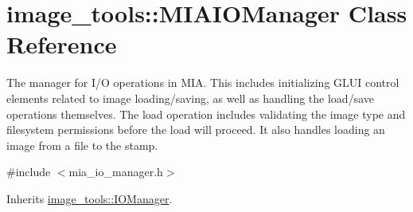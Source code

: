 \hypertarget{classimage__tools_1_1MIAIOManager}{}\section{image\+\_\+tools\+:\+:M\+I\+A\+I\+O\+Manager Class Reference}
\label{classimage__tools_1_1MIAIOManager}


The manager for I/O operations in M\+IA. This includes initializing G\+L\+UI control elements related to image loading/saving, as well as handling the load/save operations themselves. The load operation includes validating the image type and filesystem permissions before the load will proceed. It also handles loading an image from a file to the stamp.  




{\ttfamily \#include $<$mia\+\_\+io\+\_\+manager.\+h$>$}



Inherits \hyperlink{classimage__tools_1_1IOManager}{image\+\_\+tools\+::\+I\+O\+Manager}.

